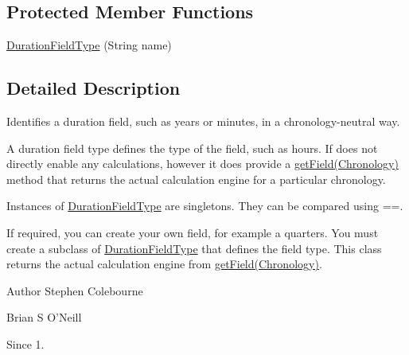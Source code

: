 \subsection*{Protected Member Functions}
\begin{DoxyCompactItemize}
\item 
\hyperlink{classorg_1_1joda_1_1time_1_1_duration_field_type_afc24e1238529ca4b09d9d6b25cfb62a4}{Duration\-Field\-Type} (String name)
\end{DoxyCompactItemize}


\subsection{Detailed Description}
Identifies a duration field, such as years or minutes, in a chronology-\/neutral way. 

A duration field type defines the type of the field, such as hours. If does not directly enable any calculations, however it does provide a \hyperlink{classorg_1_1joda_1_1time_1_1_duration_field_type_a2c04f7d6c5f7163985d78b47ede78025}{get\-Field(\-Chronology)} method that returns the actual calculation engine for a particular chronology. 

Instances of {\ttfamily \hyperlink{classorg_1_1joda_1_1time_1_1_duration_field_type}{Duration\-Field\-Type}} are singletons. They can be compared using {\ttfamily ==}. 

If required, you can create your own field, for example a quarters. You must create a subclass of {\ttfamily \hyperlink{classorg_1_1joda_1_1time_1_1_duration_field_type}{Duration\-Field\-Type}} that defines the field type. This class returns the actual calculation engine from \hyperlink{classorg_1_1joda_1_1time_1_1_duration_field_type_a2c04f7d6c5f7163985d78b47ede78025}{get\-Field(\-Chronology)}.

\begin{DoxyAuthor}{Author}
Stephen Colebourne 

Brian S O'Neill 
\end{DoxyAuthor}
\begin{DoxySince}{Since}
1. 
\end{DoxySince}


